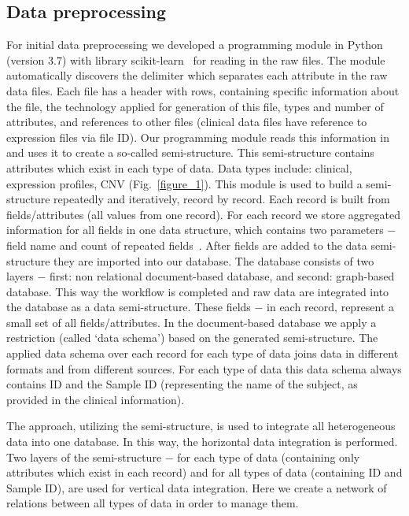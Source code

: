 \documentclass{bmcart}
\begin{document}
\subsection{Data preprocessing}

For initial data preprocessing we developed a programming module in
Python (version 3.7) with library scikit-learn~\cite{38, 39} for reading in
the raw files. The module automatically discovers the delimiter which
separates each attribute in the raw data files. Each file has a header
with rows, containing specific information about the file, the
technology applied for generation of this file, types and number of
attributes, and references to other files (clinical data files have
reference to expression files via file ID). Our programming module
reads this information in and uses it to create a so-called
semi-structure. This semi-structure contains attributes which exist in
each type of data. Data types include: clinical, expression profiles,
CNV (Fig.~\ref{figure_1}). This module is used to build a semi-structure repeatedly
and iteratively, record by record. Each record is built from
fields/attributes (all values from one record). For each record we
store aggregated information for all fields in one data structure,
which contains two parameters $-$ field name and count of repeated
fields~\cite{10}. After fields are added to the data semi-structure they are
imported into our database. The database consists of two layers $-$
first: non relational document-based database, and second: graph-based
database. This way the workflow is completed and raw data are
integrated into the database as a data semi-structure. These fields $-$
in each record, represent a small set of all fields/attributes. In the
document-based database we apply a restriction (called
{\textquoteleft}data schema{\textquoteright}) based on the generated
semi-structure. The applied data schema over each record for each type
of data joins data in different formats and from different sources. For
each type of data this data schema always contains ID and the Sample ID
(representing the name of the subject, as provided in the clinical
information). 

The approach, utilizing the semi-structure, is used to integrate all
heterogeneous data into one database. In this way, the horizontal data
integration is performed. Two layers of the semi-structure $-$ for each
type of data (containing only attributes which exist in each record)
and for all types of data (containing ID and Sample ID), are used for
vertical data integration. Here we create a network of relations
between all types of data in order to manage them.
\end{document}
